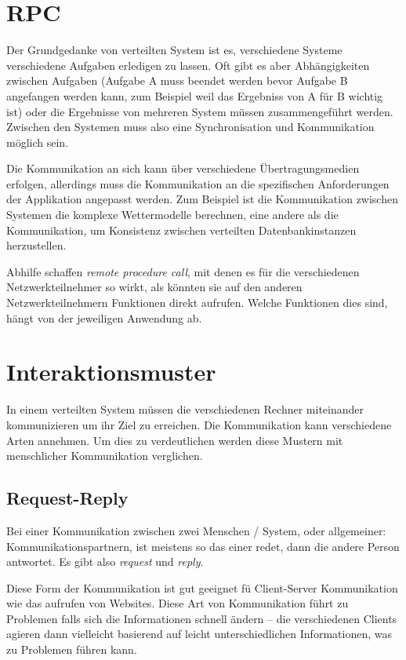 \clearpage
\section{RPC}
Der Grundgedanke von verteilten System ist es, verschiedene Systeme verschiedene Aufgaben
erledigen zu lassen. Oft gibt es aber Abh{\"{a}}ngigkeiten zwischen Aufgaben (Aufgabe A muss beendet werden
bevor Aufgabe B angefangen werden kann, zum Beispiel weil das Ergebniss von A f{\"{u}}r B wichtig
ist) oder die Ergebnisse von mehreren System m{\"{u}}ssen zusammengef{\"{u}}hrt werden. Zwischen
den Systemen muss also eine Synchronisation und Kommunikation m{\"{o}}glich sein.

Die Kommunikation
an sich kann {\"{u}}ber verschiedene {\"{U}}bertragungsmedien erfolgen, allerdings muss die
Kommunikation an die spezifischen Anforderungen der Applikation angepasst werden. Zum Beispiel
ist die Kommunikation zwischen Systemen die komplexe Wettermodelle berechnen, eine andere als die
Kommunikation, um Konsistenz zwischen verteilten Datenbankinstanzen herzustellen.

Abhilfe schaffen \textit{remote procedure call}, mit denen es f{\"{u}}r die verschiedenen Netzwerkteilnehmer
so wirkt, als k{\"{o}}nnten sie auf den anderen Netzwerkteilnehmern Funktionen direkt aufrufen. Welche
Funktionen dies sind, h{\"{a}}ngt von der jeweiligen Anwendung ab.


\clearpage
\section{Interaktionsmuster}
In einem verteilten System m{\"{u}}ssen die verschiedenen Rechner miteinander kommunizieren um
ihr Ziel zu erreichen. Die Kommunikation kann verschiedene Arten annehmen. Um dies zu verdeutlichen
werden diese Mustern mit menschlicher Kommunikation verglichen.

\subsection{Request-Reply}
Bei einer Kommunikation zwischen zwei Menschen / System, oder allgemeiner: Kommunikationspartnern,
ist meistens so das einer redet, dann die andere Person antwortet. Es gibt also \textit{request}
und \textit{reply}.

Diese Form der Kommunikation ist gut geeignet f{\"{u}} Client-Server Kommunikation wie das
aufrufen von Websites. Diese Art von Kommunikation f{\"{u}}hrt zu Problemen falls sich die
Informationen schnell {\"{a}}ndern -- die verschiedenen Clients agieren dann vielleicht basierend
auf leicht unterschiedlichen Informationen, was zu Problemen f{\"{u}}hren kann.

